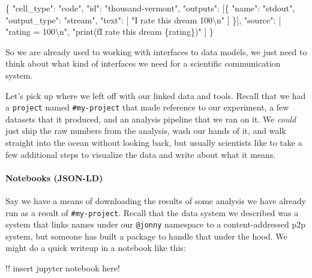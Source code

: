 \documentclass[notoc]{tufte-book}
\newenvironment{Shaded}{}{}
\newcommand{\CharTok}[1]{\textcolor[rgb]{0.25,0.44,0.63}{#1}}
\newcommand{\DataTypeTok}[1]{\textcolor[rgb]{0.56,0.13,0.00}{#1}}
\newcommand{\FunctionTok}[1]{\textcolor[rgb]{0.02,0.16,0.49}{#1}}
\newcommand{\OtherTok}[1]{\textcolor[rgb]{0.00,0.44,0.13}{#1}}
\newcommand{\StringTok}[1]{\textcolor[rgb]{0.25,0.44,0.63}{#1}}
\begin{document}
\begin{Shaded}
\begin{Highlighting}[]
\FunctionTok{\{}
  \DataTypeTok{"cell\_type"}\FunctionTok{:} \StringTok{"code"}\FunctionTok{,}
  \DataTypeTok{"id"}\FunctionTok{:} \StringTok{"thousand{-}vermont"}\FunctionTok{,}
  \DataTypeTok{"outputs"}\FunctionTok{:} \OtherTok{[}\FunctionTok{\{}
    \DataTypeTok{"name"}\FunctionTok{:} \StringTok{"stdout"}\FunctionTok{,}
    \DataTypeTok{"output\_type"}\FunctionTok{:} \StringTok{"stream"}\FunctionTok{,}
    \DataTypeTok{"text"}\FunctionTok{:} \OtherTok{[}
      \StringTok{"I rate this dream 100}\CharTok{\textbackslash{}n}\StringTok{"}
    \OtherTok{]}
  \FunctionTok{\}}\OtherTok{]}\FunctionTok{,}
  \DataTypeTok{"source"}\FunctionTok{:} \OtherTok{[}
    \StringTok{"rating = 100}\CharTok{\textbackslash{}n}\StringTok{"}\OtherTok{,}
    \StringTok{"print(f\textquotesingle{}I rate this dream \{rating\}\textquotesingle{})"}
  \OtherTok{]}
\FunctionTok{\}}
\end{Highlighting}
\end{Shaded}

So we are already used to working with interfaces to data models, we
just need to think about what kind of interfaces we need for a
scientific communication system.

Let's pick up where we left off with our linked data and tools. Recall
that we had a \texttt{project} named \texttt{\#my-project} that made
reference to our experiment, a few datasets that it produced, and an
analysis pipeline that we ran on it. We \emph{could} just ship the raw
numbers from the analysis, wash our hands of it, and walk straight into
the ocean without looking back, but usually scientists like to take a
few additional steps to visualize the data and write about what it
means.


\paragraph{Notebooks (JSON-LD)}

Say we have a means of downloading the results of some analysis we have
already run as a result of \texttt{\#my-project}. Recall that the data
system we described was a system that links names under our
\texttt{@jonny} namespace to a content-addressed p2p system, but someone
has built a package to handle that under the hood. We might do a quick
writeup in a notebook like this:

!! insert jupyter notebook here!
\end{document}
